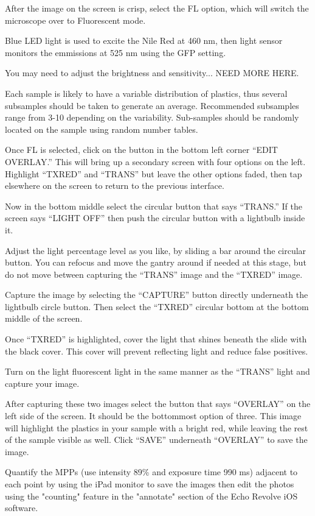 \documentclass[12pt]{../SOP4_alpha}\usepackage[]{graphicx}\usepackage[]{color}
\begin{document}
\NP After the image on the screen is crisp, select the FL option, which will switch the microscope over to Fluorescent mode. 

\NP Blue LED light is used to excite the Nile Red at 460 nm, then light sensor monitors the emmissions at 525 nm using the GFP setting.

\NP You may need to adjust the brightness and sensitivity... NEED MORE HERE.

\NP Each sample is likely to have a variable distribution of plastics, thus several subsamples should be taken to generate an average. Recommended subsamples range from 3-10 depending on the variability. Sub-samples should be randomly located on the sample using random number tables. 

\NP Once FL is selected, click on the button in the bottom left corner ``EDIT OVERLAY.'' This will bring up a secondary screen with four options on the left. Highlight ``TXRED'' and “TRANS” but leave the other options faded, then tap elsewhere on the screen to return to the previous interface.

\NP Now in the bottom middle select the circular button that says ``TRANS.'' If the screen says ``LIGHT OFF'' then push the circular button with a lightbulb inside it. 

\NP Adjust the light percentage level as you like, by sliding a bar around the circular button. You can refocus and move the gantry around if needed at this stage, but do not move between capturing the ``TRANS'' image and the ``TXRED'' image. 

\NP Capture the image by selecting the ``CAPTURE'' button directly underneath the lightbulb circle button. Then select the ``TXRED'' circular bottom at the bottom middle of the screen.

\NP Once ``TXRED'' is highlighted, cover the light that shines beneath the slide with the black cover. This cover will prevent reflecting light and reduce false positives. 

\NP Turn on the light fluorescent light in the same manner as the ``TRANS'' light and capture your image. 

\NP After capturing these two images select the button that says ``OVERLAY'' on the left side of the screen. It should be the bottommost option of three. This image will highlight the plastics in your sample with a bright red, while leaving the rest of the sample visible as well. Click ``SAVE'' underneath ``OVERLAY'' to save the image.

\NP Quantify the MPPs (use intensity 89\% and exposure time 990 ms) adjacent to each point by using the iPad monitor to save the images then edit the photos using the "counting" feature in the "annotate" section of the Echo Revolve iOS software.
\end{document}
